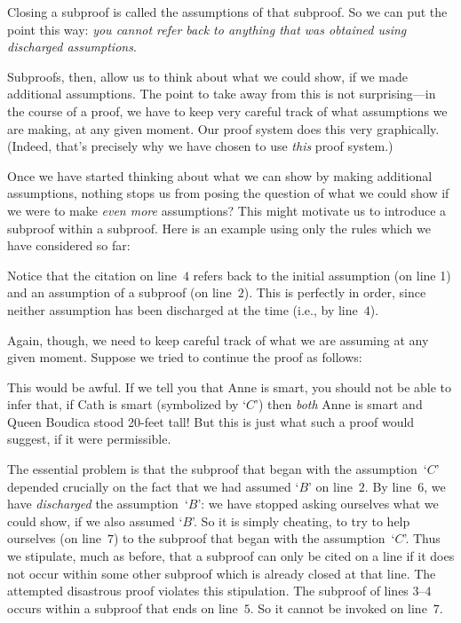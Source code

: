 Closing a subproof is called  the assumptions of that subproof. So we can put the point this way: \emph{you cannot refer back to anything that was obtained using discharged assumptions}.

Subproofs, then, allow us to think about what we could show, if we made additional assumptions. The point to take away from this is not surprising---in the course of a proof, we have to keep very careful track of what assumptions we are making, at any given moment. Our proof system does this very graphically. (Indeed, that's precisely why we have chosen to use \emph{this} proof system.)

Once we have started thinking about what we can show by making additional assumptions, nothing stops us from posing the question of what we could show if we were to make \emph{even more} assumptions? This might motivate us to introduce a subproof within a subproof. Here is an example using only the rules which we have considered so far: 
\begin{fitchproof}
\open
	\open
	\close
\close
{}
\end{fitchproof}
Notice that the citation on line~$4$ refers back to the initial assumption (on line 1) and an assumption of a subproof (on line~$2$). This is perfectly in order, since neither assumption has been discharged at the time (i.e., by line~$4$).

Again, though, we need to keep careful track of what we are assuming at any given moment. Suppose we tried to continue the proof as follows:
\begin{fitchproof}
\open
	\open
	\close
\close
{}
 
\end{fitchproof}
This would be awful. If we tell you that Anne is smart, you should not be able to infer that, if Cath is smart (symbolized by `$C$') then \emph{both} Anne is smart and Queen Boudica stood 20-feet tall! But this is just what such a proof would suggest, if it were permissible.

The essential problem is that the subproof that began with the assumption~`$C$' depended crucially on the fact that we had assumed `$B$' on line~$2$. By line~$6$, we have \emph{discharged} the assumption~`$B$': we have stopped asking ourselves what we could show, if we also assumed `$B$'. So it is simply cheating, to try to help ourselves (on line~$7$) to the subproof that began with the assumption~`$C$'. Thus we stipulate, much as before, that a subproof can only be cited on a line if it does not occur within some other subproof which is already closed at that line. The attempted disastrous proof violates this stipulation. The subproof of lines $3$--$4$ occurs within a subproof that ends on line~$5$. So it cannot be invoked on line~$7$.

